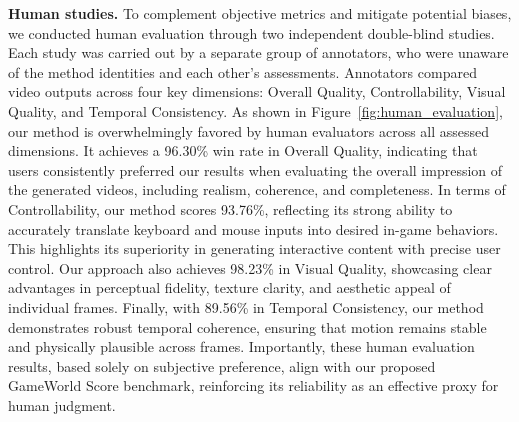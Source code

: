 \documentclass{article}
\begin{document}
\textbf{Human studies.} To complement objective metrics and mitigate potential biases, we conducted human evaluation through two independent double-blind studies. Each study was carried out by a separate group of annotators, who were unaware of the method identities and each other’s assessments. Annotators compared video outputs across four key dimensions: Overall Quality, Controllability, Visual Quality, and Temporal Consistency. As shown in Figure~\ref{fig:human_evaluation}, our method is overwhelmingly favored by human evaluators across all assessed dimensions. It achieves a 96.30\% win rate in Overall Quality, indicating that users consistently preferred our results when evaluating the overall impression of the generated videos, including realism, coherence, and completeness. In terms of Controllability, our method scores 93.76\%, reflecting its strong ability to accurately translate keyboard and mouse inputs into desired in-game behaviors. This highlights its superiority in generating interactive content with precise user control. Our approach also achieves 98.23\% in Visual Quality, showcasing clear advantages in perceptual fidelity, texture clarity, and aesthetic appeal of individual frames. Finally, with 89.56\% in Temporal Consistency, our method demonstrates robust temporal coherence, ensuring that motion remains stable and physically plausible across frames. Importantly, these human evaluation results, based solely on subjective preference, align with our proposed {GameWorld Score} benchmark, reinforcing its reliability as an effective proxy for human judgment. 
\end{document}
